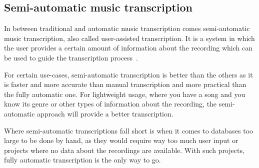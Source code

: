 \subsection{Semi-automatic music transcription}
In between traditional and automatic music transcription comes semi-automatic music transcription, also called user-assisted transcription. It is a system in which the user provides a certain amount of information about the recording which can be used to guide the transcription process~\cite{semi-automatic}.
\par

For certain use-cases, semi-automatic transcription is better than the others as it is faster and more accurate than manual transcription and more practical than the fully automatic one. For lightweight usage, where you have a song and you know its genre or other types of information about the recording, the semi-automatic approach will provide a better transcription.

\par
Where semi-automatic transcriptions fall short is when it comes to databases too large to be done by hand, as they would require way too much user input or projects where no data about the recordings are available. With such projects, fully automatic transcription is the only way to go.